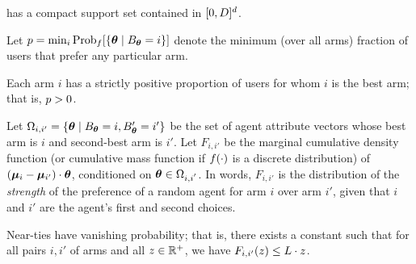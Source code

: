 \begin{assumption} \label{A2}
\AgentDist has a compact support set contained in $[0,D]^d$.
\end{assumption}

Let $\MinProb = \min_{i} \Prob[\AgentDist]{\Set{\AgV}{\Best{\AgV} = i}}$
denote the minimum (over all arms) fraction of users that prefer any
particular arm.

\begin{assumption} \label{A3}
Each arm $i$ has a strictly positive proportion of users for whom $i$
is the best arm; that is, $p > 0$.
\end{assumption}

Let $\Omega_{i,i'} = \{ \bm{\theta} \mid B_{\bm{\theta}} = i, B'_{\bm{\theta}} = i' \}$
be the set of agent attribute vectors whose best arm is $i$ and
second-best arm is $i'$.
Let $F_{i,i'}$ be the marginal cumulative density function
(or cumulative mass function if $f(\cdot)$ is a discrete distribution)
of $(\bm{\mu}_{i}-\bm{\mu}_{i'}) \cdot \bm{\theta}$,
conditioned on $\bm{\theta} \in \Omega_{i,i^{'}}$.
In words, $F_{i,i'}$ is the distribution of the \emph{strength} of the
preference of a random agent for arm $i$ over arm $i'$, given that
$i$ and $i'$ are the agent's first and second choices.

\begin{assumption} \label{A1}
Near-ties have vanishing probability; 
that is, there exists a constant \TieDensity such that
for all pairs $i,i'$ of arms and all $z \in \mathbb{R}^+$,
we have $F_{i,i'}(z) \leq L \cdot z$.
\end{assumption}







